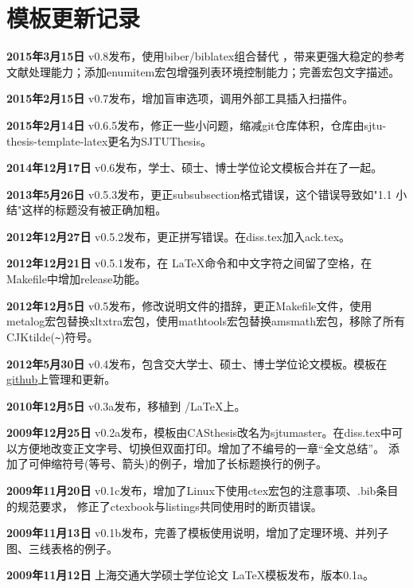 \chapter{模板更新记录}
\label{chap:updatelog}

\textbf{2015年3月15日} v0.8发布，使用biber/biblatex组合替代 \BibTeX ，带来更强大稳定的参考文献处理能力；添加enumitem宏包增强列表环境控制能力；完善宏包文字描述。

\textbf{2015年2月15日} v0.7发布，增加盲审选项，调用外部工具插入扫描件。

\textbf{2015年2月14日} v0.6.5发布，修正一些小问题，缩减git仓库体积，仓库由sjtu-thesis-template-latex更名为SJTUThesis。

\textbf{2014年12月17日} v0.6发布，学士、硕士、博士学位论文模板合并在了一起。

\textbf{2013年5月26日} v0.5.3发布，更正subsubsection格式错误，这个错误导致如"1.1 小结"这样的标题没有被正确加粗。

\textbf{2012年12月27日} v0.5.2发布，更正拼写错误。在diss.tex加入ack.tex。

\textbf{2012年12月21日} v0.5.1发布，在 \LaTeX 命令和中文字符之间留了空格，在Makefile中增加release功能。

\textbf{2012年12月5日} v0.5发布，修改说明文件的措辞，更正Makefile文件，使用metalog宏包替换xltxtra宏包，使用mathtools宏包替换amsmath宏包，移除了所有CJKtilde(\verb+~+)符号。

\textbf{2012年5月30日} v0.4发布，包含交大学士、硕士、博士学位论文模板。模板在\href{https://github.com/weijianwen/sjtu-thesis-template-latex}{github}上管理和更新。

\textbf{2010年12月5日} v0.3a发布，移植到 \XeTeX/\LaTeX 上。

\textbf{2009年12月25日} v0.2a发布，模板由CASthesis改名为sjtumaster。在diss.tex中可以方便地改变正文字号、切换但双面打印。增加了不编号的一章“全文总结”。
添加了可伸缩符号(等号、箭头)的例子，增加了长标题换行的例子。

\textbf{2009年11月20日} v0.1c发布，增加了Linux下使用ctex宏包的注意事项、.bib条目的规范要求，
修正了ctexbook与listings共同使用时的断页错误。

\textbf{2009年11月13日} v0.1b发布，完善了模板使用说明，增加了定理环境、并列子图、三线表格的例子。

\textbf{2009年11月12日} 上海交通大学硕士学位论文 \LaTeX 模板发布，版本0.1a。

